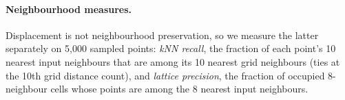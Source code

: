 \paragraph{Neighbourhood measures.} Displacement is not neighbourhood preservation, so we
measure the latter separately on 5{,}000 sampled points: \emph{kNN recall}, the fraction of
each point's 10 nearest input neighbours that are among its 10 nearest grid neighbours
(ties at the 10th grid distance count), and \emph{lattice precision}, the fraction of
occupied 8-neighbour cells whose points are among the 8 nearest input neighbours.

